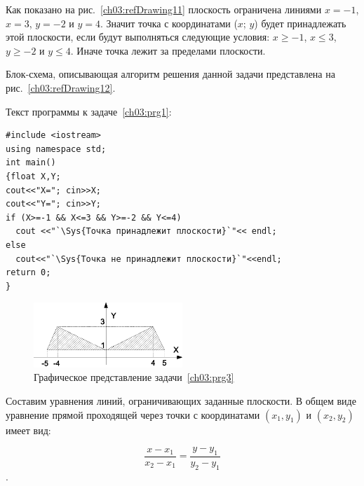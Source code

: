 Как показано на рис.~\ref{ch03:refDrawing11} плоскость ограничена линиями $x=-1$, $x=3$,
$y=-2$ и $y=4$. Значит точка с координатами ($x$;
$y$) будет принадлежать этой плоскости, если будут выполняться следующие условия: 
$x\geqslant -1$, $x\leqslant 3$, $y\geqslant -2$ и $y\leqslant 4$. Иначе точка лежит за пределами плоскости.

Блок-схема, описывающая алгоритм решения данной задачи представлена на рис.~\ref{ch03:refDrawing12}.


Текст программы к задаче~\ref{ch03:prg1}:
\begin{lstlisting}
#include <iostream>
using namespace std;
int main()
{float X,Y;
cout<<"X="; cin>>X;
cout<<"Y="; cin>>Y;
if (X>=-1 && X<=3 && Y>=-2 && Y<=4)
  cout <<"`\Sys{Точка принадлежит плоскости}`"<< endl;
else 
  cout<<"`\Sys{Точка не принадлежит плоскости}`"<<endl;
return 0;
}
\end{lstlisting}


\begin{figure}[htb]
\begin{center}
\includegraphics[width=0.5\textwidth]{img/ris_3_14}
\caption{Графическое представление задачи~\ref{ch03:prg3}}
\label{ch03:refDrawing13}
\end{center}
\end{figure}

Составим уравнения линий, ограничивающих заданные плоскости. В общем виде уравнение прямой проходящей через точки с
координатами  $(x_1,y_1)$ и  $(x_2,y_2)$  имеет вид:

 $$\frac{x-x_1}{x_2-x_1}=\frac{y-y_1}{y_2-y_1}$$.

